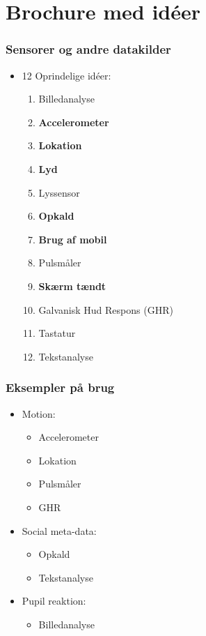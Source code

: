 \section{Brochure med idéer}

\begin{frame}
\frametitle{Sensorer og andre datakilder}

\begin{itemize}
\item 12 Oprindelige idéer:
\begin{enumerate}
\item Billedanalyse
\item\textbf{Accelerometer}
\item\textbf{Lokation}
\item \textbf{Lyd}
\item Lyssensor
\item\textbf{Opkald}
\item\textbf{Brug af mobil}
\item Pulsmåler
\item \textbf{Skærm tændt}
\item Galvanisk Hud Respons (GHR)
\item Tastatur
\item Tekstanalyse
\end{enumerate}
\end{itemize}

\end{frame}

\begin{frame}
\frametitle{Eksempler på brug}

\begin{itemize}
\item Motion:
\begin{itemize}
\item Accelerometer
\item Lokation
\item Pulsmåler
\item GHR
\end{itemize}
\item Social meta-data:
\begin{itemize}
\item Opkald
\item Tekstanalyse
\end{itemize}
\item Pupil reaktion:
\begin{itemize}
\item Billedanalyse
\end{itemize}
\end{itemize}

\end{frame}
